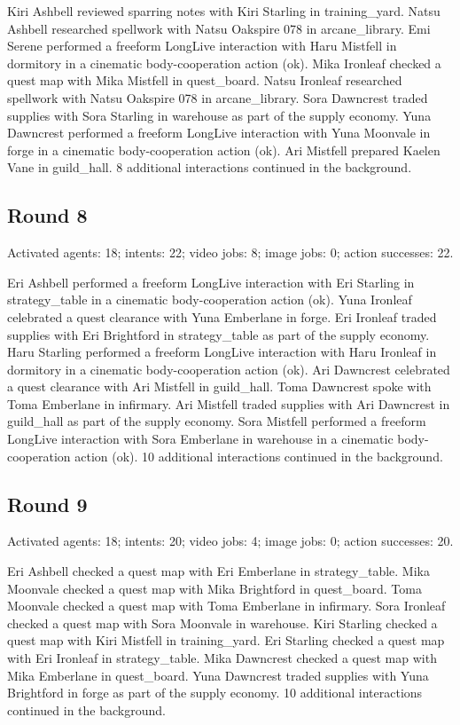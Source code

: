 \documentclass[11pt,a4paper]{article}
\begin{document}
Kiri Ashbell reviewed sparring notes with Kiri Starling in training\_yard. Natsu Ashbell researched spellwork with Natsu Oakspire 078 in arcane\_library. Emi Serene performed a freeform LongLive interaction with Haru Mistfell in dormitory in a cinematic body-cooperation action (ok). Mika Ironleaf checked a quest map with Mika Mistfell in quest\_board. Natsu Ironleaf researched spellwork with Natsu Oakspire 078 in arcane\_library. Sora Dawncrest traded supplies with Sora Starling in warehouse as part of the supply economy. Yuna Dawncrest performed a freeform LongLive interaction with Yuna Moonvale in forge in a cinematic body-cooperation action (ok). Ari Mistfell prepared Kaelen Vane in guild\_hall. 8 additional interactions continued in the background.

\subsection{Round 8}
Activated agents: 18; intents: 22; video jobs: 8; image jobs: 0; action successes: 22.

Eri Ashbell performed a freeform LongLive interaction with Eri Starling in strategy\_table in a cinematic body-cooperation action (ok). Yuna Ironleaf celebrated a quest clearance with Yuna Emberlane in forge. Eri Ironleaf traded supplies with Eri Brightford in strategy\_table as part of the supply economy. Haru Starling performed a freeform LongLive interaction with Haru Ironleaf in dormitory in a cinematic body-cooperation action (ok). Ari Dawncrest celebrated a quest clearance with Ari Mistfell in guild\_hall. Toma Dawncrest spoke with Toma Emberlane in infirmary. Ari Mistfell traded supplies with Ari Dawncrest in guild\_hall as part of the supply economy. Sora Mistfell performed a freeform LongLive interaction with Sora Emberlane in warehouse in a cinematic body-cooperation action (ok). 10 additional interactions continued in the background.

\subsection{Round 9}
Activated agents: 18; intents: 20; video jobs: 4; image jobs: 0; action successes: 20.

Eri Ashbell checked a quest map with Eri Emberlane in strategy\_table. Mika Moonvale checked a quest map with Mika Brightford in quest\_board. Toma Moonvale checked a quest map with Toma Emberlane in infirmary. Sora Ironleaf checked a quest map with Sora Moonvale in warehouse. Kiri Starling checked a quest map with Kiri Mistfell in training\_yard. Eri Starling checked a quest map with Eri Ironleaf in strategy\_table. Mika Dawncrest checked a quest map with Mika Emberlane in quest\_board. Yuna Dawncrest traded supplies with Yuna Brightford in forge as part of the supply economy. 10 additional interactions continued in the background.
\end{document}
